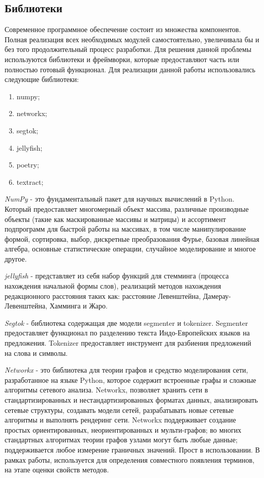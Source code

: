 \subsection{Библиотеки}
Современное программное обеспечение состоит из множества компонентов. 
Полная реализация всех необходимых модулей самостоятельно, увеличивала бы и без того продолжительный процесс разработки.
Для решения данной проблемы используются библиотеки и фреймворки, которые предоставляют часть или полностью готовый функционал.
Для реализации данной работы использовались следующие библиотеки:
\begin{enumerate}
	\item numpy;
	\item networkx;
	\item segtok;
	\item jellyfish;
	\item poetry;
	\item textract;
\end{enumerate}
\textit{NumPy} - это фундаментальный пакет для научных вычислений в Python. 
Который предоставляет многомерный объект массива, различные производные объекты (такие как маскированные массивы и матрицы) и ассортимент подпрограмм для быстрой работы на массивах, в том числе манипулирование формой, сортировка, выбор, дискретные преобразования Фурье, базовая линейная алгебра, основные статистические операции, случайное моделирование и многое другое.

\textit{jellyfish} -  представляет из себя набор функций для стемминга (процесса нахождения начальной формы слов), реализаций методов нахождения редакционного расстояния таких как: расстояние Левенштейна, Дамерау-Левенштейна, Хамминга и Жаро.

\textit{Segtok} - библиотека содержащая две модели segmenter и tokenizer. Segmenter предоставляет функционал по разделению текста Индо-Европейских языков на предложения.
Tokenizer предоставляет инструмент для разбиения предложений на слова и символы.

\textit{Networkx} - это библиотека для теории графов и средство моделирования сети, разработанное на языке Python, которое содержит встроенные графы и сложные алгоритмы сетевого анализа.
Networkx, позволяет хранить сети в стандартизированных и нестандартизированных форматах данных, анализировать сетевые структуры, создавать модели сетей, разрабатывать новые сетевые алгоритмы и выполнять рендеринг сети.
Networkx поддерживает создание простых ориентированных, неориентированных и мульти-графов; во многих стандартных алгоритмах теории графов узлами могут быть любые данные; поддерживается любое измерение граничных значений.
Прост в использовании.
В рамках работы, используется для определения совместного появления терминов, на этапе оценки свойств методов.

